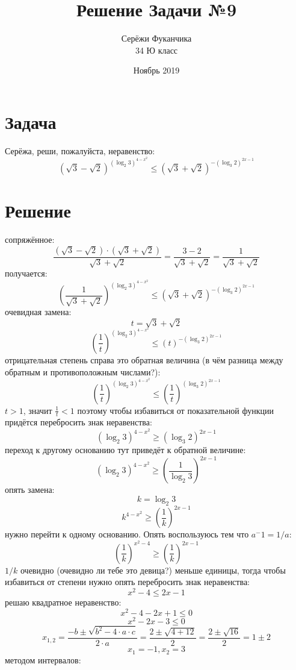 \documentclass{article}
\title{Решение Задачи №9}
\author{Серёжи Фуканчика\\34 Ю класс}
\date{Ноябрь 2019}
\begin{document}
\maketitle

\section{Задача}
Серёжа, реши, пожалуйста, неравенство:
$$\left(\sqrt{3}-\sqrt{2}\right)^{(\log_{2}{3})^{4-x^2}} \leq \left(\sqrt{3}+\sqrt{2}\right)^{-(\log_{3}{2})^{2x-1}}$$

\section{Решение}
сопряжённое:
$$\frac{(\sqrt{3}-\sqrt{2})\cdot(\sqrt{3}+\sqrt{2})}{\sqrt{3}+\sqrt{2}}=\frac{3-2}{\sqrt{3}+\sqrt{2}}=\frac{1}{\sqrt{3}+\sqrt{2}}$$
получается:
$$\left(\frac{1}{\sqrt{3}+\sqrt{2}}\right)^{(\log_{2}{3})^{4-x^2}} \leq \left(\sqrt{3}+\sqrt{2}\right)^{-(\log_{3}{2})^{2x-1}}$$
очевидная замена:
$$t=\sqrt{3}+\sqrt{2}$$
$$\left(\frac{1}{t}\right)^{(\log_{2}{3})^{4-x^2}} \leq \left(t\right)^{-(\log_{3}{2})^{2x-1}}$$
отрицательная степень справа это обратная величина (в чём разница между обратным и противоположным числами?):
$$\left(\frac{1}{t}\right)^{(\log_{2}{3})^{4-x^2}} \leq \left(\frac{1}{t}\right)^{(\log_{3}{2})^{2x-1}}$$
$t>1$, значит $\frac{1}{t}<1$ поэтому чтобы избавиться от показательной функции придётся перебросить знак неравенства:
$${(\log_{2}{3})^{4-x^2}} \geq {(\log_{3}{2})^{2x-1}}$$
переход к другому основанию тут приведёт к обратной величине:
$${(\log_{2}{3})^{4-x^2}} \geq {(\frac{1}{\log_{2}{3}})^{2x-1}}$$
опять замена:
$$k=\log_{2}{3}$$
$${k^{4-x^2}} \geq {\left(\frac{1}{k}\right)^{2x-1}}$$
нужно перейти к одному основанию. Опять воспользуюсь тем что $a^-1=1/a$:
$${\left(\frac{1}{k}\right)^{x^2-4}} \geq {\left(\frac{1}{k}\right)^{2x-1}}$$
$1/k$ очевидно (очевидно ли тебе это девица?) меньше единицы, тогда чтобы избавиться от степени нужно опять перебросить знак неравенства:
$$x^2-4 \leq {2x-1}$$
решаю квадратное неравенство:
$$x^2-4 -2x+1 \leq 0$$
$$x^2-2x-3 \leq 0$$
$$x_{1,2}=\frac{-b\pm{}\sqrt{b^2-4\cdot{}a\cdot{}c}}{2\cdot{}a}=\frac{2\pm{}\sqrt{4+12}}{2}=\frac{2\pm{}\sqrt{16}}{2}=1\pm{}2$$
$$x_1=-1,x_2=3$$
методом интервалов:

\begin{center}
\end{center}
\end{document}

